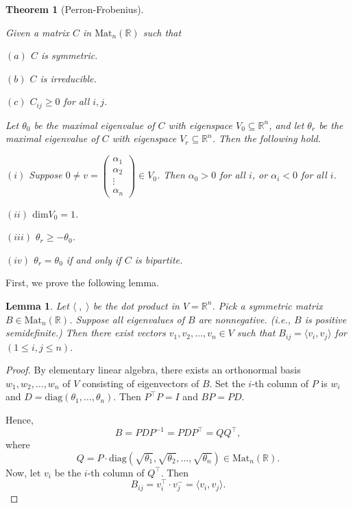 \documentclass[
]{book}
\newtheorem{theorem}{Theorem}[chapter]
\newtheorem{lemma}{Lemma}[chapter]
\theoremstyle{definition}
\theoremstyle{definition}
\theoremstyle{definition}
\theoremstyle{definition}
\theoremstyle{remark}
\begin{document}
\begin{theorem}[Perron-Frobenius]
\protect\hypertarget{thm:pf}{}\label{thm:pf}

Given a matrix \(C\) in \(\mathrm{Mat}_n(\mathbb{R})\) such that

\((a)\) \(C\) is symmetric.

\((b)\) \(C\) is irreducible.

\((c)\) \(C_{ij} \geq 0\) for all \(i,j\).

Let \(\theta_0\) be the maximal eigenvalue of \(C\) with eigenspace \(V_0 \subseteq \mathbb{R}^n\), and let \(\theta_r\) be the maximal eigenvalue of \(C\) with eigenspace \(V_r \subseteq \mathbb{R}^n\). Then the following hold.

\((i)\) Suppose \(0\neq v = \begin{pmatrix}\alpha_1\\\alpha_2\\\vdots\\\alpha_n\end{pmatrix} \in V_0\). Then \(\alpha_0 > 0\) for all \(i\), or \(\alpha_i < 0\) for all \(i\).

\((ii)\) \(\mathrm{dim}V_0 = 1\).

\((iii)\) \(\theta_r \geq -\theta_0\).

\((iv)\) \(\theta_r = \theta_0\) if and only if \(C\) is bipartite.

\end{theorem}

First, we prove the following lemma.

\begin{lemma}
\protect\hypertarget{lem:pfl}{}\label{lem:pfl}Let \(\langle \;,\; \rangle\) be the dot product in \(V = \mathbb{R}^n\). Pick a symmetric matrix \(B \in \mathrm{Mat}_n(\mathbb{R})\). Suppose all eigenvalues of \(B\) are nonnegative. (i.e., \(B\) is positive semidefinite.) Then there exist vectors \(v_1, v_2, \ldots, v_n\in V\) such that \(B_{ij} = \langle v_i, v_j\rangle\) for \((1\leq i, j \leq n)\).
\end{lemma}

\begin{proof}
By elementary linear algebra, there exists an orthonormal basis \(w_1, w_2, \ldots, w_n\) of \(V\) consisting of eigenvectors of \(B\). Set the \(i\)-th column of \(P\) is \(w_i\) and \(D = \mathrm{diag}(\theta_1,\ldots, \theta_n)\). Then \(P^\top P = I\) and \(BP = PD\).

Hence,
\[B = PDP^{-1} = PDP^\top = QQ^\top,\]
where
\[Q = P\cdot \mathrm{diag}(\sqrt{\theta_1}, \sqrt{\theta_2}, \ldots, \sqrt{\theta_n}) \in \mathrm{Mat}_n(\mathbb{R}).\]
Now, let \(v_i\) be the \(i\)-th column of \(Q^\top\). Then
\[B_{ij} = v_i^\top\cdot v_j^- = \langle v_i, v_j\rangle.\]
\end{proof}
\end{document}
